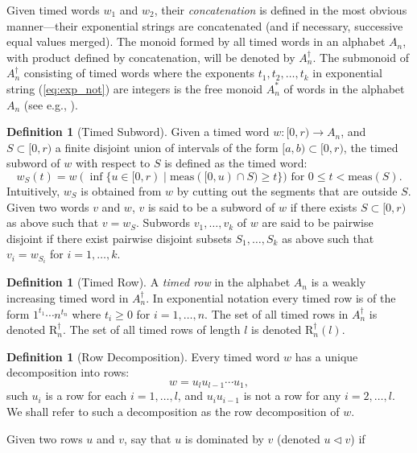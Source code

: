\documentclass[10pt]{amsproc}
\theoremstyle{definition}
\newtheorem{definition}[theorem]{Definition}
\theoremstyle{remark}
\newcommand{\tr}{\mathrm{R}^\dagger}
\begin{document}
Given timed words $w_1$ and $w_2$, their \emph{concatenation} is defined in the most obvious manner---their exponential strings are concatenated (and if necessary, successive equal values merged).
The monoid formed by all timed words in an alphabet $A_n$, with product defined by concatenation, will be denoted by $A_n^\dagger$.
The submonoid of $A_n^\dagger$ consisting of timed words where the exponents $t_1,t_2,\dotsc,t_k$ in exponential string (\ref{eq:exp_not}) are integers is the free monoid $A_n^*$ of words in the alphabet $A_n$ (see e.g., \cite[Chapter~1]{comb-words}).
\begin{definition}
  [Timed Subword]
  \label{definition:timed-subword}
  Given a timed word $w:[0,r)\to A_n$, and $S\subset [0,r)$ a finite disjoint union of intervals of the form $[a, b)\subset [0,r)$, the timed subword of $w$ with respect to $S$ is defined as the timed word:
  \begin{displaymath}
    w_S(t) = w(\inf\{u\in [0,r)\mid \mathrm{meas}([0,u)\cap S) \geq t\}) \text{ for } 0\leq t < \mathrm{meas}(S).
  \end{displaymath}
  Intuitively, $w_S$ is obtained from $w$ by cutting out the segments that are outside $S$.
  Given two words $v$ and $w$, $v$ is said to be a subword of $w$ if there exists $S\subset [0,r)$ as above such that $v=w_S$.
  Subwords $v_1,\dotsc,v_k$ of $w$ are said to be pairwise disjoint if there exist pairwise disjoint subsets $S_1,\dotsc,S_k$ as above such that $v_i=w_{S_i}$ for $i=1,\dotsc,k$.
\end{definition}
\begin{definition}[Timed Row]
A \emph{timed row} in the alphabet $A_n$ is a weakly increasing timed word in $A_n^\dagger$.
In exponential notation every timed row is of the form $1^{t_1}\dotsb n^{t_n}$ where $t_i\geq 0$ for $i=1,\dotsc,n$.
The set of all timed rows in $A_n^\dagger$ is denoted $\tr_n$.
The set of all timed rows of length $l$ is denoted $\tr_n(l)$.
\end{definition}
\begin{definition}[Row Decomposition]
Every timed word $w$ has a unique decomposition into rows:
\begin{displaymath}
  w = u_l u_{l-1}\dotsb u_1,
\end{displaymath}
such $u_i$ is a row for each $i=1,\dotsc,l$, and $u_iu_{i-1}$ is not a row for any $i=2,\dotsc,l$.
We shall refer to such a decomposition as the row decomposition of $w$.
\end{definition}
Given two rows $u$ and $v$, say that $u$ is dominated by $v$ (denoted $u\lhd v$) if
\end{document}
